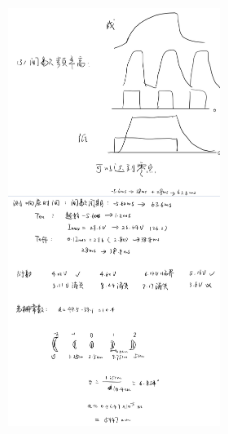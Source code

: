 \documentclass[12pt,a4paper]{article}
\begin{document}
\begin{figure}[H]
    \centering
    \includegraphics[width=0.5\textwidth]{数据3.jpg}
\end{figure}
\end{document}

